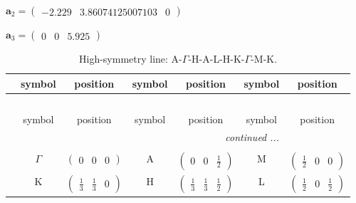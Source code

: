 \documentclass[fleqn,10pt,landscape]{article}
\begin{document}
\begin{itemize}
\quad $\bm{a}_2=\begin{pmatrix} -2.229 & 3.86074125007103 & 0 \end{pmatrix}$

\quad $\bm{a}_3=\begin{pmatrix} 0 & 0 & 5.925 \end{pmatrix}$

\begin{center}
\renewcommand{\arraystretch}{1.3}
\begin{longtable}{c|cc|cc|cc}
\caption{High-symmetry line: A-$\Gamma$-H-A-L-H-K-$\Gamma$-M-K.}
 \\
 \hline \hline
 & symbol & position & symbol & position & symbol & position \\ \hline \endfirsthead

\multicolumn{6}{l}{\tablename\ \thetable{}} \\
 \hline \hline
 & symbol & position & symbol & position & symbol & position \\ \hline \endhead

 \hline \hline
\multicolumn{6}{r}{\footnotesize\it continued ...} \\ \endfoot

 \hline \hline
\multicolumn{6}{r}{} \\ \endlastfoot

 & $\Gamma$ & $\begin{pmatrix} 0 & 0 & 0 \end{pmatrix}$ & A & $\begin{pmatrix} 0 & 0 & \frac{1}{2} \end{pmatrix}$ & M & $\begin{pmatrix} \frac{1}{2} & 0 & 0 \end{pmatrix}$ \\
& K & $\begin{pmatrix} \frac{1}{3} & \frac{1}{3} & 0 \end{pmatrix}$ & H & $\begin{pmatrix} \frac{1}{3} & \frac{1}{3} & \frac{1}{2} \end{pmatrix}$ & L & $\begin{pmatrix} \frac{1}{2} & 0 & \frac{1}{2} \end{pmatrix}$ \\
\end{longtable}
\end{center}


\end{itemize}
\end{document}
